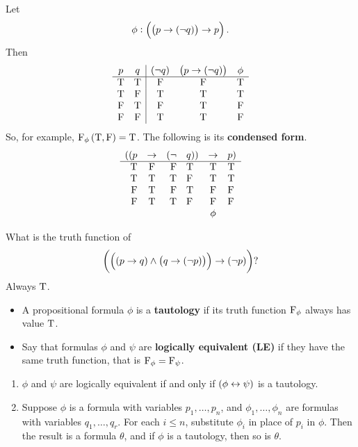 \begin{example*}
Let
$$ \phi : \impb{\impb{p}{\notb{q}}}{p}. $$
Then
$$
\begin{array}{cc|ccc}
p & q & \notb{q} & \impb{p}{\notb{q}} & \phi \\
\hline
\T & \T & \F & \F & \T \\
\T & \F & \T & \T & \T \\
\F & \T & \F & \T & \F \\
\F & \F & \T & \T & \F
\end{array}
$$
So, for example, $ \F_\phi\br{\T, \F} = \T $. The following is its \textbf{condensed form}.
$$
\begin{array}{rcrlcl}
((p & \rightarrow & (\neg & q)) & \rightarrow & p) \\
\hline
\mathrm{T} & \mathrm{F} & \mathrm{F} & \mathrm{T} & \mathrm{T} & \mathrm{T} \\
\mathrm{T} & \mathrm{T} & \mathrm{T} & \mathrm{F} & \mathrm{T} & \mathrm{T} \\
\mathrm{F} & \mathrm{T} & \mathrm{F} & \mathrm{T} & \mathrm{F} & \mathrm{F} \\
\mathrm{F} & \mathrm{T} & \mathrm{T} & \mathrm{F} & \mathrm{F} & \mathrm{F} \\
& & & & \phi &
\end{array}
$$
\end{example*}


\begin{example*}
What is the truth function of
$$ \impb{\andb{\impb{p}{q}}{\impb{q}{\notb{p}}}}{\notb{p}}? $$
Always $ \mathrm{T} $.
\end{example*}

\begin{definition}
\hfill
\begin{itemize}
\item A propositional formula $ \phi $ is a \textbf{tautology} if its truth function $ \mathrm{F}_\phi $ always has value $ \mathrm{T} $.
\item Say that formulas $ \phi $ and $ \psi $ are \textbf{logically equivalent (LE)} if they have the same truth function, that is $ \mathrm{F}_\phi = \mathrm{F}_\psi $.
\end{itemize}
\end{definition}

\begin{remark}
\label{rem:1.1.5}
\hfill
\begin{enumerate}
\item $ \phi $ and $ \psi $ are logically equivalent if and only if $ \iffb{\phi}{\psi} $ is a tautology.
\item Suppose $ \phi $ is a formula with variables $ p_1, \dots, p_n $, and $ \phi_1, \dots, \phi_n $ are formulas with variables $ q_1, \dots, q_r $. For each $ i \le n $, substitute $ \phi_i $ in place of $ p_i $ in $ \phi $. Then the result is a formula $ \theta $, and if $ \phi $ is a tautology, then so is $ \theta $.
\end{enumerate}
\end{remark}

